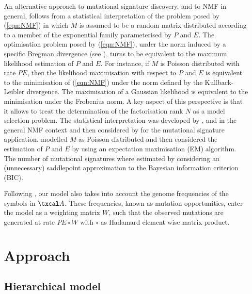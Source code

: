 \documentclass{bioinfo}
\begin{document}
An alternative approach to mutational signature discovery, and to NMF
in general, follows from a statistical interpretation of the problem
posed by (\ref{eqn:NMF}) in which $M$ is assumed to be a random matrix
distributed according to a member of the exponential family
parameterised by $P$ and $E$. The optimisation problem posed by
(\ref{eqn:NMF}), under the norm induced by a specific Bregman
divergence (see \citealp{BMD}), turns to be equivalent to the maximum
likelihood estimation of $P$ and $E$.  For instance, if $M$ is Poisson
distributed with rate $PE$, then the likelihood maximisation with
respect to $P$ and $E$ is equivalent to the minimisation of
(\ref{eqn:NMF}) under the norm defined by the Kullback-Leibler
divergence. The maximisation of a Gaussian likelihood is equivalent to
the minimisation under the Frobenius norm. A key aspect of this
perspective is that it allows to treat the determination of the
factorisation rank $N$ as a model selection problem. The statistical
interpretation was developed by \cite{C}, \cite{FC} and \cite{SWK} in
the general NMF context and then considered by \cite{FICMV} for the
mutational signature application. \cite{FICMV} modelled $M$ as Poisson
distributed and then considered the estimation of $P$ and $E$ by using
an expectation maximisation (EM) algorithm. The number of mutational
signatures where estimated by considering an (unnecessary) saddlepoint
approximation to the Bayesian information criterion
(BIC). 


Following \cite{FICMV}, our model also takes into account the genome
frequencies of the symbols in $\txcal A$.  These frequencies, known as
mutation opportunities, enter the model as a weighting matrix $W$,
such  that the observed mutations are generated at rate $PE\circ W$
with $\circ$ as  Hadamard element wise matrix product.


\section{Approach}
\subsection{Hierarchical model}
\end{document}
